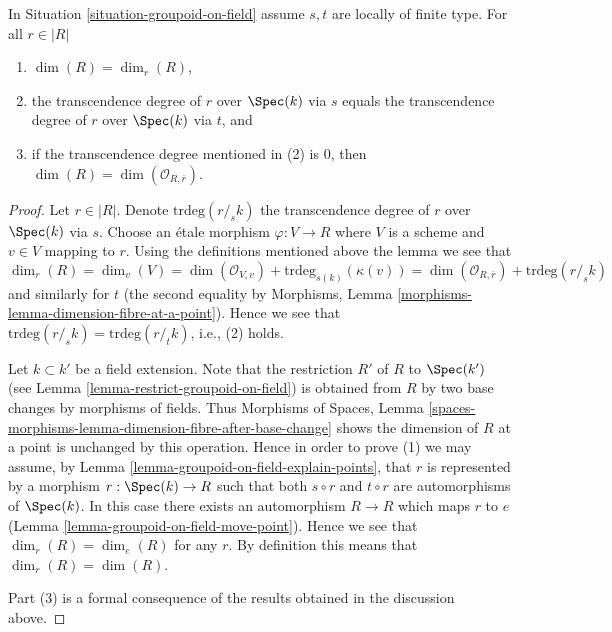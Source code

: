 \begin{lemma}
\label{lemma-groupoid-on-field-locally-finite-type-dimension}
In
Situation \ref{situation-groupoid-on-field}
assume $s, t$ are locally of finite type.
For all $r \in |R|$
\begin{enumerate}
\item $\dim(R) = \dim_r(R)$,
\item the transcendence degree of $r$ over $\Spec(k)$
via $s$ equals the transcendence degree of $r$ over $\Spec(k)$
via $t$, and
\item if the transcendence degree mentioned in (2) is $0$, then
$\dim(R) = \dim(\mathcal{O}_{R, \overline{r}})$.
\end{enumerate}
\end{lemma}

\begin{proof}
Let $r \in |R|$. Denote $\text{trdeg}(r/_{\!\! s}k)$ the transcendence
degree of $r$ over $\Spec(k)$ via $s$. Choose an \'etale morphism
$\varphi : V \to R$ where $V$ is a scheme and $v \in V$ mapping to $r$.
Using the definitions mentioned above the lemma we see that
$$
\dim_r(R) = \dim_v(V) =
\dim(\mathcal{O}_{V, v}) + \text{trdeg}_{s(k)}(\kappa(v)) =
\dim(\mathcal{O}_{R, \overline{r}}) + \text{trdeg}(r/_{\!\! s}k)
$$
and similarly for $t$ (the second equality by
Morphisms, Lemma \ref{morphisms-lemma-dimension-fibre-at-a-point}).
Hence we see that $\text{trdeg}(r/_{\!\! s}k) = \text{trdeg}(r/_{\!\! t}k)$,
i.e., (2) holds.

\medskip\noindent
Let $k \subset k'$ be a field extension. Note that the restriction $R'$
of $R$ to $\Spec(k')$ (see
Lemma \ref{lemma-restrict-groupoid-on-field})
is obtained from $R$ by two base changes by morphisms of fields. Thus
Morphisms of Spaces,
Lemma \ref{spaces-morphisms-lemma-dimension-fibre-after-base-change}
shows the dimension of $R$ at a point is unchanged by this operation.
Hence in order to prove (1) we may assume, by
Lemma \ref{lemma-groupoid-on-field-explain-points},
that $r$ is represented by a morphism $r : \Spec(k) \to R$ such
that both $s \circ r$ and $t \circ r$ are automorphisms of $\Spec(k)$.
In this case there exists an automorphism $R \to R$ which maps $r$ to $e$
(Lemma \ref{lemma-groupoid-on-field-move-point}).
Hence we see that $\dim_r(R) = \dim_e(R)$ for any $r$. By definition this
means that $\dim_r(R) = \dim(R)$.

\medskip\noindent
Part (3) is a formal consequence of the results obtained in the discussion
above.
\end{proof}

